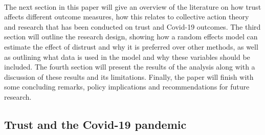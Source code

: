 \documentclass[
  11pt,
]{article}
\begin{document}
~\\
The next section in this paper will give an overview of the literature on how trust affects different outcome measures, how this relates to collective action theory and research that has been conducted on trust and Covid-19 outcomes. The third section will outline the research design, showing how a random effects model can estimate the effect of distrust and why it is preferred over other methods, as well as outlining what data is used in the model and why these variables should be included. The fourth section will present the results of the analysis along with a discussion of these results and its limitations. Finally, the paper will finish with some concluding remarks, policy implications and recommendations for future research.\\

\hypertarget{trust-and-the-covid-19-pandemic}{%
\subsection{Trust and the Covid-19 pandemic}\label{trust-and-the-covid-19-pandemic}}
\end{document}
